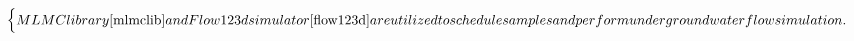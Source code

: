 \documentclass{article}
\begin{document}
\begin{equation}
\begin{cases}
MLMC library \cite{mlmclib} and Flow123d simulator \cite{flow123d} are utilized to schedule samples and perform underground water flow simulation. 








\end{cases}
\end{equation}
\end{document}
